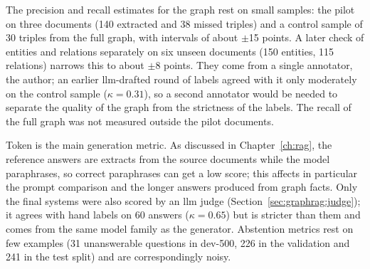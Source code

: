 The precision and recall estimates for the graph rest on small samples: the pilot on
three documents (140 extracted and 38 missed triples) and a control sample of 30 triples
from the full graph, with intervals of about $\pm$15 points. A later check of entities and relations separately on six unseen documents (150 entities, 115 relations) narrows this to about $\pm$8 points. They come from a single
annotator, the author; an earlier \gls{llm}-drafted round of labels agreed with it only
moderately on the control sample ($\kappa = 0.31$), so a second annotator would be needed
to separate the quality of the graph from the strictness of the labels. The recall of the
full graph was not measured outside the pilot documents.

Token \fone{} is the main generation metric. As discussed in Chapter~\ref{ch:rag}, the
reference answers are extracts from the source documents while the model paraphrases, so
correct paraphrases can get a low score; this affects in particular the prompt comparison
and the longer answers produced from graph facts. Only the final systems were also scored by an
\gls{llm} judge (Section~\ref{sec:graphrag:judge}); it agrees with hand labels on 60 answers
($\kappa = 0.65$) but is stricter than them and comes from the same model family as the generator. Abstention metrics rest on few examples
(31 unanswerable questions in dev-500, 226 in the validation and 241 in the test split)
and are correspondingly noisy.
